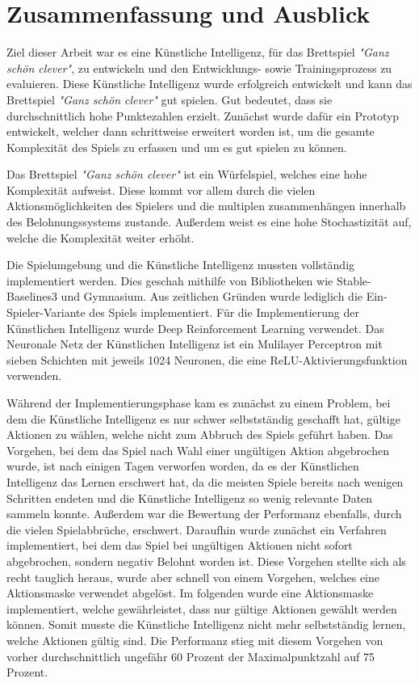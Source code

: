 \section{Zusammenfassung und Ausblick}

Ziel dieser Arbeit war es eine Künstliche Intelligenz, für das Brettspiel \textit{"Ganz schön clever"}, zu entwickeln und den Entwicklungs- sowie Trainingsprozess zu evaluieren.
Diese Künstliche Intelligenz wurde erfolgreich entwickelt und kann das Brettspiel \textit{"Ganz schön clever"} gut spielen. Gut bedeutet, dass sie durchschnittlich hohe Punktezahlen erzielt. Zunächst wurde dafür ein Prototyp entwickelt, welcher dann schrittweise erweitert worden ist, um die gesamte Komplexität des Spiels zu erfassen und um es gut spielen zu können.

Das Brettspiel \textit{"Ganz schön clever"} ist ein Würfelspiel, welches eine hohe Komplexität aufweist. Diese kommt vor allem durch die vielen Aktionsmöglichkeiten des Spielers und die multiplen zusammenhängen innerhalb des Belohnungssystems zustande. Außerdem weist es eine hohe Stochastizität auf, welche die Komplexität weiter erhöht.


Die Spielumgebung und die Künstliche Intelligenz mussten vollständig implementiert werden. Dies geschah mithilfe von Bibliotheken wie Stable-Baselines3 und Gymnasium. Aus zeitlichen Gründen wurde lediglich die Ein-Spieler-Variante des Spiels implementiert. Für die Implementierung der Künstlichen Intelligenz wurde Deep Reinforcement Learning verwendet. Das Neuronale Netz der Künstlichen Intelligenz ist ein Mulilayer Perceptron mit sieben Schichten mit jeweils 1024 Neuronen, die eine ReLU-Aktivierungsfunktion verwenden.

Während der Implementierungsphase kam es zunächst zu einem Problem, bei dem die Künstliche Intelligenz es nur schwer selbstständig geschafft hat, gültige Aktionen zu wählen, welche nicht zum Abbruch des Spiels geführt haben. Das Vorgehen, bei dem das Spiel nach Wahl einer ungültigen Aktion abgebrochen wurde, ist nach einigen Tagen verworfen worden, da es der Künstlichen Intelligenz das Lernen erschwert hat, da die meisten Spiele bereits nach wenigen Schritten endeten und die Künstliche Intelligenz so wenig relevante Daten sammeln konnte. Außerdem war die Bewertung der Performanz ebenfalls, durch die vielen Spielabbrüche, erschwert. Daraufhin wurde zunächst ein Verfahren implementiert, bei dem das Spiel bei ungültigen Aktionen nicht sofort abgebrochen, sondern negativ Belohnt worden ist. Diese Vorgehen stellte sich als recht tauglich heraus, wurde aber schnell von einem Vorgehen, welches eine Aktionsmaske verwendet abgelöst. Im folgenden wurde eine Aktionsmaske implementiert, welche gewährleistet, dass nur gültige Aktionen gewählt werden können. Somit musste die Künstliche Intelligenz nicht mehr selbstständig lernen, welche Aktionen gültig sind. Die Performanz stieg mit diesem Vorgehen von vorher durchschnittlich ungefähr 60 Prozent der Maximalpunktzahl auf 75 Prozent.

